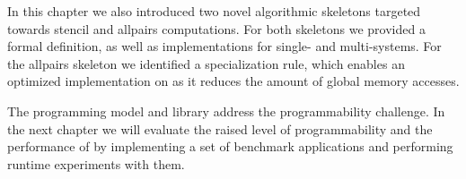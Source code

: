 In this chapter we also introduced two novel algorithmic skeletons targeted towards stencil and allpairs computations.
For both skeletons we provided a formal definition, as well as implementations for single- and multi-\GPU systems.
For the allpairs skeleton we identified a specialization rule, which enables an optimized implementation on \GPUs as it reduces the amount of global memory accesses.

The \SkelCL programming model and library address the programmability challenge.
In the next chapter we will evaluate the raised level of programmability and the performance of \SkelCL by implementing a set of benchmark applications and performing runtime experiments with them.

